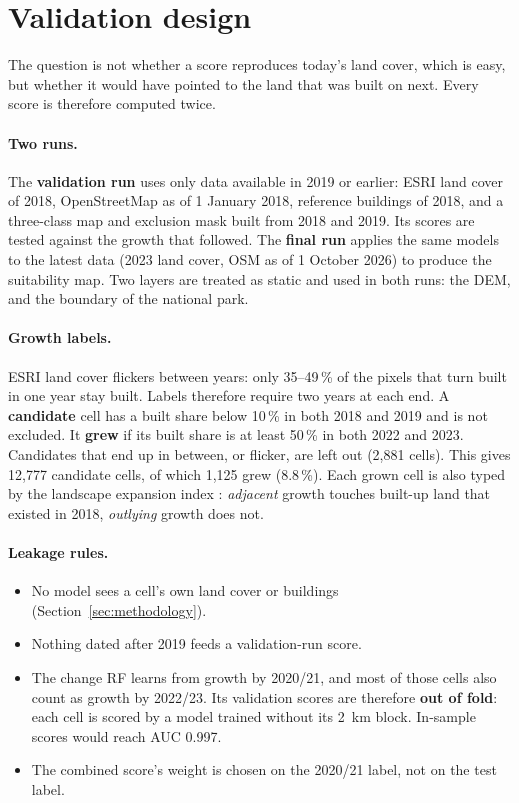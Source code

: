 \section{Validation design}\label{sec:validation_design}

The question is not whether a score reproduces today's land cover, which is easy, but whether
it would have pointed to the land that was built on next. Every score is therefore computed
twice.

\paragraph{Two runs.} The \textbf{validation run} uses only data available in 2019 or earlier:
ESRI land cover of 2018, OpenStreetMap as of 1 January 2018, reference buildings of 2018, and a
three-class map and exclusion mask built from 2018 and 2019. Its scores are tested against the
growth that followed. The \textbf{final run} applies the same models to the latest data (2023
land cover, OSM as of 1 October 2026) to produce the suitability map. Two layers are treated as
static and used in both runs: the DEM, and the boundary of the national park.

\paragraph{Growth labels.} ESRI land cover flickers between years: only 35--49\,\% of the pixels
that turn built in one year stay built. Labels therefore require two years at each end. A
\textbf{candidate} cell has a built share below 10\,\% in both 2018 and 2019 and is not
excluded. It \textbf{grew} if its built share is at least 50\,\% in both 2022 and 2023.
Candidates that end up in between, or flicker, are left out (2{,}881 cells). This gives
12{,}777 candidate cells, of which 1{,}125 grew (8.8\,\%). Each grown cell is also typed by the
landscape expansion index \citep{liu2010lei}: \emph{adjacent} growth touches built-up land
that existed in 2018, \emph{outlying} growth does not.

\paragraph{Leakage rules.}
\begin{itemize}
  \item No model sees a cell's own land cover or buildings (Section~\ref{sec:methodology}).
  \item Nothing dated after 2019 feeds a validation-run score.
  \item The change RF learns from growth by 2020/21, and most of those cells also count as
        growth by 2022/23. Its validation scores are therefore \textbf{out of fold}: each cell
        is scored by a model trained without its \SI{2}{\km} block. In-sample scores would
        reach AUC 0.997.
  \item The combined score's weight is chosen on the 2020/21 label, not on the test label.
\end{itemize}

